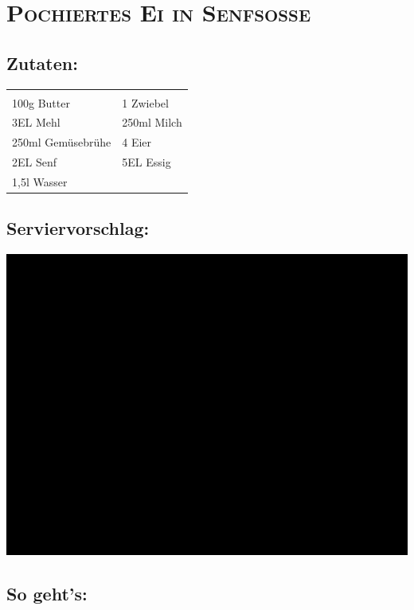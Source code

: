 \section{\textsc{Pochiertes Ei in Senfsoße}}

\subsection*{Zutaten:}

\begin{tabular}{p{7.5cm} p{7.5cm}}
	& \\
	100g Butter & 1 Zwiebel \\
	3EL Mehl & 250ml Milch \\
  250ml Gemüsebrühe & 4 Eier \\
  2EL Senf & 5EL Essig \\
  1,5l Wasser &
\end{tabular}

\subsection*{Serviervorschlag:}

\includegraphics[width=\textwidth]{img/ph.jpg}

\subsection*{So geht's:}

